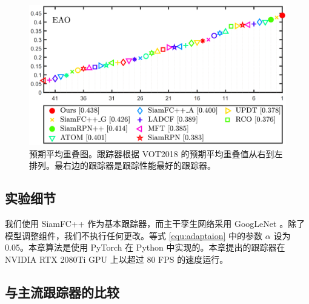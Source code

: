 \begin{figure}[t]
    \centering
    \includegraphics[width=1.0\textwidth]{Img/MTP/vot18/vot18_eao.png}
    \caption{预期平均重叠图。跟踪器根据 VOT2018 的预期平均重叠值从右到左排列。最右边的跟踪器是跟踪性能最好的跟踪器。}
    \label{fig:eao}
\end{figure}

\subsection{实验细节}
我们使用 SiamFC++ \cite{SiamFC++} 作为基本跟踪器，而主干孪生网络采用 GoogLeNet \cite{GoogLeNet}。除了模型调整组件，我们不执行任何更改。等式 \ref{equ:adaptaion} 中的参数 $\alpha$ 设为 0.05。本章算法是使用 PyTorch 在 Python 中实现的。本章提出的跟踪器在 NVIDIA RTX 2080Ti GPU 上以超过 80 FPS 的速度运行。

\subsection{与主流跟踪器的比较}

